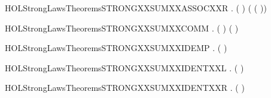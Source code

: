 \newcommand{\HOLStrongLawsTheoremsSTRONGXXSUMXXASSOCXXL}{\UseVerbatim{HOLStrongLawsTheoremsSTRONGXXSUMXXASSOCXXL}}
\begin{SaveVerbatim}{HOLStrongLawsTheoremsSTRONGXXSUMXXASSOCXXR}
\HOLTokenTurnstile{} \HOLSymConst{\HOLTokenForall{}}  .  ( \HOLSymConst{\ensuremath{+}}  \HOLSymConst{\ensuremath{+}} ) ( \HOLSymConst{\ensuremath{+}} ( \HOLSymConst{\ensuremath{+}} ))
\end{SaveVerbatim}
\newcommand{\HOLStrongLawsTheoremsSTRONGXXSUMXXASSOCXXR}{\UseVerbatim{HOLStrongLawsTheoremsSTRONGXXSUMXXASSOCXXR}}
\begin{SaveVerbatim}{HOLStrongLawsTheoremsSTRONGXXSUMXXCOMM}
\HOLTokenTurnstile{} \HOLSymConst{\HOLTokenForall{}} .  ( \HOLSymConst{\ensuremath{+}} ) ( \HOLSymConst{\ensuremath{+}} )
\end{SaveVerbatim}
\newcommand{\HOLStrongLawsTheoremsSTRONGXXSUMXXCOMM}{\UseVerbatim{HOLStrongLawsTheoremsSTRONGXXSUMXXCOMM}}
\begin{SaveVerbatim}{HOLStrongLawsTheoremsSTRONGXXSUMXXIDEMP}
\HOLTokenTurnstile{} \HOLSymConst{\HOLTokenForall{}}.  ( \HOLSymConst{\ensuremath{+}} ) 
\end{SaveVerbatim}
\newcommand{\HOLStrongLawsTheoremsSTRONGXXSUMXXIDEMP}{\UseVerbatim{HOLStrongLawsTheoremsSTRONGXXSUMXXIDEMP}}
\begin{SaveVerbatim}{HOLStrongLawsTheoremsSTRONGXXSUMXXIDENTXXL}
\HOLTokenTurnstile{} \HOLSymConst{\HOLTokenForall{}}.  ( \HOLSymConst{\ensuremath{+}} ) 
\end{SaveVerbatim}
\newcommand{\HOLStrongLawsTheoremsSTRONGXXSUMXXIDENTXXL}{\UseVerbatim{HOLStrongLawsTheoremsSTRONGXXSUMXXIDENTXXL}}
\begin{SaveVerbatim}{HOLStrongLawsTheoremsSTRONGXXSUMXXIDENTXXR}
\HOLTokenTurnstile{} \HOLSymConst{\HOLTokenForall{}}.  ( \HOLSymConst{\ensuremath{+}} ) 
\end{SaveVerbatim}
\newcommand{\HOLStrongLawsTheoremsSTRONGXXSUMXXIDENTXXR}{\UseVerbatim{HOLStrongLawsTheoremsSTRONGXXSUMXXIDENTXXR}}
